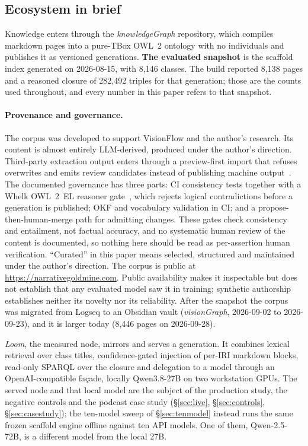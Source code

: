 \documentclass[10pt,twocolumn]{article}
\begin{document}
\subsection{Ecosystem in brief}\label{sec:ecosystem}
Knowledge enters through the \emph{knowledgeGraph} repository, which compiles markdown pages into a pure-TBox OWL~2 ontology with no individuals and publishes it as versioned generations. \textbf{The evaluated snapshot} is the scaffold index generated on 2026-08-15, with 8{,}146 classes. The build reported 8{,}138 pages and a reasoned closure of 282{,}492 triples for that generation; those are the counts used throughout, and every number in this paper refers to that snapshot.

\paragraph{Provenance and governance.} The corpus was developed to support VisionFlow and the author's research. Its content is almost entirely LLM-derived, produced under the author's direction. Third-party extraction output enters through a preview-first import that refuses overwrites and emits review candidates instead of publishing machine output~\cite{ontocast}. The documented governance has three parts: CI consistency tests together with a Whelk OWL~2~EL reasoner gate~\cite{whelk}, which rejects logical contradictions before a generation is published; OKF and vocabulary validation in CI; and a propose-then-human-merge path for admitting changes. These gates check consistency and entailment, not factual accuracy, and no systematic human review of the content is documented, so nothing here should be read as per-assertion human verification. ``Curated'' in this paper means selected, structured and maintained under the author's direction. The corpus is public at \url{https://narrativegoldmine.com}. Public availability makes it inspectable but does not establish that any evaluated model saw it in training; synthetic authorship establishes neither its novelty nor its reliability. After the snapshot the corpus was migrated from Logseq to an Obsidian vault (\emph{visionGraph}, 2026-09-02 to 2026-09-23), and it is larger today (8{,}446 pages on 2026-09-28).

\emph{Loom}, the measured node, mirrors and serves a generation. It combines lexical retrieval over class titles, confidence-gated injection of per-IRI markdown blocks, read-only SPARQL over the closure and delegation to a model through an OpenAI-compatible fa\c{c}ade, locally Qwen3.8-27B on two workstation GPUs. The served node and that local model are the subject of the production study, the negative controls and the podcast case study (\S\ref{sec:live}, \S\ref{sec:controls}, \S\ref{sec:casestudy}); the ten-model sweep of \S\ref{sec:tenmodel} instead runs the same frozen scaffold engine offline against ten API models. One of them, Qwen-2.5-72B, is a different model from the local 27B.
\end{document}
